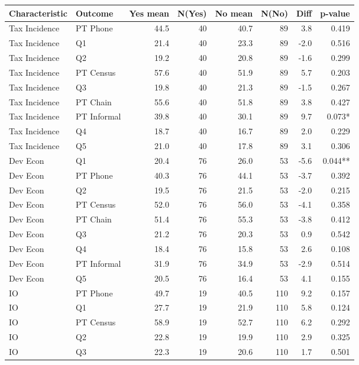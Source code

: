\begin{tabular}{llrrrrrr}
\hline
Characteristic & Outcome & Yes mean & N(Yes) & No mean & N(No) & Diff & p-value \\
\hline
Tax Incidence & PT Phone &  44.5 &   40 &  40.7 &   89 &   3.8 &  0.419 \\
Tax Incidence & Q1 &  21.4 &   40 &  23.3 &   89 &  -2.0 &  0.516 \\
Tax Incidence & Q2 &  19.2 &   40 &  20.8 &   89 &  -1.6 &  0.299 \\
Tax Incidence & PT Census &  57.6 &   40 &  51.9 &   89 &   5.7 &  0.203 \\
Tax Incidence & Q3 &  19.8 &   40 &  21.3 &   89 &  -1.5 &  0.267 \\
Tax Incidence & PT Chain &  55.6 &   40 &  51.8 &   89 &   3.8 &  0.427 \\
Tax Incidence & PT Informal &  39.8 &   40 &  30.1 &   89 &   9.7 &  0.073* \\
Tax Incidence & Q4 &  18.7 &   40 &  16.7 &   89 &   2.0 &  0.229 \\
Tax Incidence & Q5 &  21.0 &   40 &  17.8 &   89 &   3.1 &  0.306 \\
Dev Econ & Q1 &  20.4 &   76 &  26.0 &   53 &  -5.6 &  0.044** \\
Dev Econ & PT Phone &  40.3 &   76 &  44.1 &   53 &  -3.7 &  0.392 \\
Dev Econ & Q2 &  19.5 &   76 &  21.5 &   53 &  -2.0 &  0.215 \\
Dev Econ & PT Census &  52.0 &   76 &  56.0 &   53 &  -4.1 &  0.358 \\
Dev Econ & PT Chain &  51.4 &   76 &  55.3 &   53 &  -3.8 &  0.412 \\
Dev Econ & Q3 &  21.2 &   76 &  20.3 &   53 &   0.9 &  0.542 \\
Dev Econ & Q4 &  18.4 &   76 &  15.8 &   53 &   2.6 &  0.108 \\
Dev Econ & PT Informal &  31.9 &   76 &  34.9 &   53 &  -2.9 &  0.514 \\
Dev Econ & Q5 &  20.5 &   76 &  16.4 &   53 &   4.1 &  0.155 \\
IO & PT Phone &  49.7 &   19 &  40.5 &  110 &   9.2 &  0.157 \\
IO & Q1 &  27.7 &   19 &  21.9 &  110 &   5.8 &  0.124 \\
IO & PT Census &  58.9 &   19 &  52.7 &  110 &   6.2 &  0.292 \\
IO & Q2 &  22.8 &   19 &  19.9 &  110 &   2.9 &  0.325 \\
IO & Q3 &  22.3 &   19 &  20.6 &  110 &   1.7 &  0.501 \\

\end{tabular}

